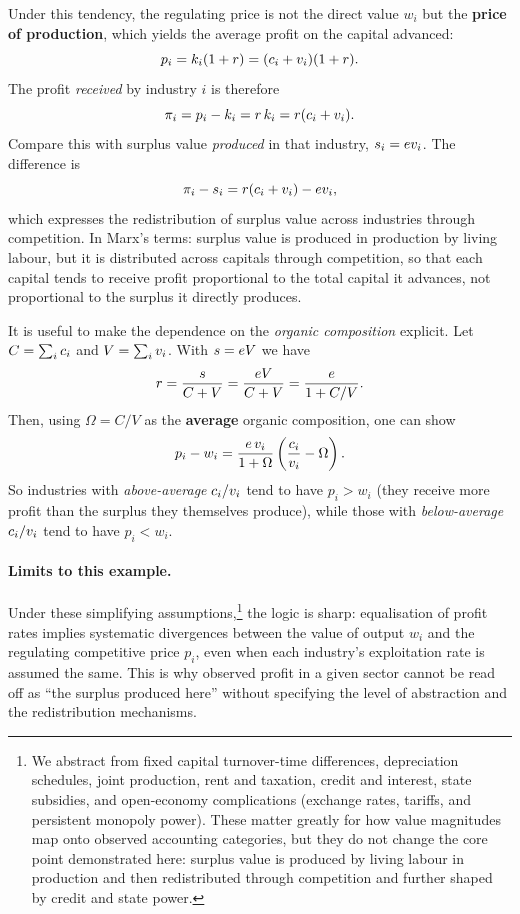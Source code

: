 Under this tendency, the regulating price is not the direct value $w_i$ but the
\textbf{price of production}, which yields the average profit on the capital advanced:
\begin{equation}
  p_i = k_i(1+r) = (c_i + v_i)(1+r).
  \label{eq:price-of-production}
\end{equation}
The profit \emph{received} by industry $i$ is therefore
\[
  \pi_i = p_i - k_i = r\,k_i = r(c_i+v_i).
\]
Compare this with surplus value \emph{produced} in that industry, $s_i=ev_i$.
The difference is
\[
  \pi_i - s_i = r(c_i+v_i) - ev_i,
\]
which expresses the redistribution of surplus value across industries through competition.
In Marx's terms: surplus value is produced in production by living labour, but it is distributed across capitals through competition,
so that each capital tends to receive profit proportional to the total capital it advances, not proportional to the surplus it directly produces.

It is useful to make the dependence on the \emph{organic composition} explicit.
Let $C=\sum_i c_i$ and $V=\sum_i v_i$. With $s=e V$ we have
\[
  r = \frac{s}{C+V} = \frac{e V}{C+V}
  = \frac{e}{1 + C/V}.
\]
Then, using $\Omega = C/V$ as the \textbf{average} organic composition, one can show
\begin{equation}
\label{eq:pop-deviation}
p_i - w_i
=
\frac{e\,v_i}{1+\Omega}
\left(
  \frac{c_i}{v_i}-\Omega
\right).
\end{equation}
So industries with \emph{above-average} $c_i/v_i$ tend to have $p_i>w_i$
(they receive more profit than the surplus they themselves produce), while those with
\emph{below-average} $c_i/v_i$ tend to have $p_i<w_i$.

\paragraph{Limits to this example.}
Under these simplifying assumptions,\footnote{We abstract from fixed capital turnover-time differences, depreciation schedules,
joint production, rent and taxation, credit and interest, state subsidies, and open-economy complications (exchange rates, tariffs,
and persistent monopoly power). These matter greatly for how value magnitudes map onto observed accounting categories, but they do
not change the core point demonstrated here: surplus value is produced by living labour in production and then redistributed through
competition and further shaped by credit and state power.}
the logic is sharp: equalisation of profit rates implies systematic divergences between the value of output $w_i$ and the regulating
competitive price $p_i$, even when each industry's exploitation rate is assumed the same. This is why observed profit in a given sector
cannot be read off as ``the surplus produced here'' without specifying the level of abstraction and the redistribution mechanisms.

